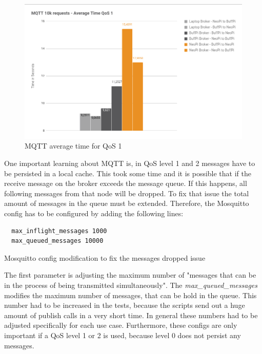 \begin{figure}[H]
    \centering
    \includegraphics[width=\textwidth]{resources/images/performance_mqtt_average_time_qos_1.png}
    \caption[MQTT average time for QoS 1]{MQTT average time for QoS 1}
    \label{fig:performance_mqtt_average_time_qos_1}
\end{figure}

One important learning about MQTT is, in \ac{QoS} level 1 and 2 messages have to be persisted in a local cache.
This took some time and it is possible that if the receive message on the broker exceeds the message queue.
If this happens, all following messages from that node will be dropped.
To fix that issue the total amount of messages in the queue must be extended.
Therefore, the Mosquitto config has to be configured by adding the following lines:

\begin{listing}[H]
  \begin{verbatim}
  max_inflight_messages 1000
  max_queued_messages 10000
  \end{verbatim}
  \caption[Mosquitto config modification to fix the messages dropped issue]{Mosquitto config modification to fix the messages dropped issue}
  \label{code:performance_mosquitto_config}
\end{listing}

The first parameter is adjusting the maximum number of "messages that can be in the process of being transmitted simultaneously"\autocite{Mosquitto:Conf:Documentation}.
The \textit{max\_queued\_messages} modifies the maximum number of messages, that can be hold in the queue.\autocite[cf.]{Mosquitto:Conf:Documentation}
This number had to be increased in the tests, because the scripts send out a huge amount of publish calls in a very short time.
In general these numbers had to be adjusted specifically for each use case.
Furthermore, these configs are only important if a \ac{QoS} level 1 or 2 is used, because level 0 does not persist any messages.
